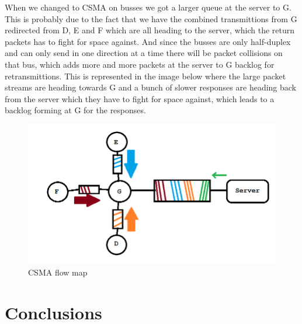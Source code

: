\documentclass{article}
\begin{document}
When we changed to CSMA on busses we got a larger queue at the server to G. This is probably due
to the fact that we have the combined transmittions from G redirected from D, E and F which are 
all heading to the server, which the return packets has to fight for space against. And since the
busses are only half-duplex and can only send in one direction at a time there will be packet 
collisions on that bus, which adds more and more packets at the server to G backlog for retransmittions.
This is represented in the image below where the large packet streams are heading towards G and a bunch 
of slower responses are heading back from the server which they have to fight for space against, which 
leads to a backlog forming at G for the responses.
\begin{figure}[h!]
  \includegraphics[width=\linewidth]{csmamap.png}
  \caption{CSMA flow map}
  \label{fig:csma}
\end{figure}

\section{Conclusions}



\end{document}
